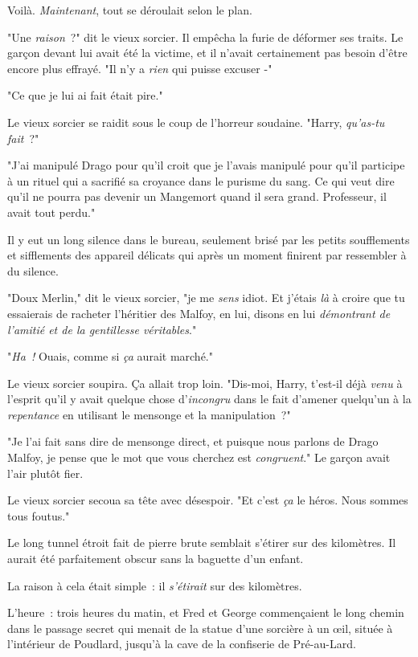 Voilà. \emph{Maintenant}, tout se déroulait selon le plan.


"Une \emph{raison}~?" dit le vieux sorcier. Il empêcha la furie de déformer ses traits. Le garçon devant lui avait été la victime, et il n'avait certainement pas besoin d'être encore plus effrayé. "Il n'y a \emph{rien} qui puisse excuser -"

"Ce que je lui ai fait était pire."

Le vieux sorcier se raidit sous le coup de l'horreur soudaine. "Harry, \emph{qu'as-tu fait}~?"

"J'ai manipulé Drago pour qu'il croit que je l'avais manipulé pour qu'il participe à un rituel qui a sacrifié sa croyance dans le purisme du sang. Ce qui veut dire qu'il ne pourra pas devenir un Mangemort quand il sera grand. Professeur, il avait tout perdu."

Il y eut un long silence dans le bureau, seulement brisé par les petits soufflements et sifflements des appareil délicats qui après un moment finirent par ressembler à du silence.

"Doux Merlin," dit le vieux sorcier, "je me \emph{sens} idiot. Et j'étais \emph{là} à croire que tu essaierais de racheter l'héritier des Malfoy, en lui, disons en lui \emph{démontrant de l'amitié et de la gentillesse véritables}."

"\emph{Ha~!} Ouais, comme si \emph{ça} aurait marché."

Le vieux sorcier soupira. Ça allait trop loin. "Dis-moi, Harry, t'est-il déjà \emph{venu} à l'esprit qu'il y avait quelque chose d'\emph{incongru} dans le fait d'amener quelqu'un à la \emph{repentance} en utilisant le mensonge et la manipulation~?"

"Je l'ai fait sans dire de mensonge direct, et puisque nous parlons de Drago Malfoy, je pense que le mot que vous cherchez est \emph{congruent}." Le garçon avait l'air plutôt fier.

Le vieux sorcier secoua sa tête avec désespoir. "Et c'est \emph{ça} le héros. Nous sommes tous foutus."


Le long tunnel étroit fait de pierre brute semblait s'étirer sur des kilomètres. Il aurait été parfaitement obscur sans la baguette d'un enfant.

La raison à cela était simple~: il \emph{s'étirait} sur des kilomètres.

L'heure~: trois heures du matin, et Fred et George commençaient le long chemin dans le passage secret qui menait de la statue d'une sorcière à un œil, située à l'intérieur de Poudlard, jusqu'à la cave de la confiserie de Pré-au-Lard.

